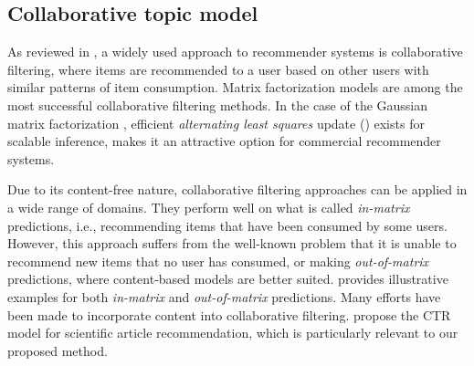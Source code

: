 
\subsection{Collaborative topic model}\label{chpt:content:sec:ctm}

As reviewed in , a widely used approach to recommender systems is collaborative filtering, where items are recommended to a user based on other
users with similar patterns of item consumption. Matrix factorization models \citep{hu2008collaborative, koren2009matrix} are among the most successful collaborative filtering methods. In the case of the Gaussian matrix factorization \citep{salakhutdinov2007probabilistic}, efficient \textit{alternating least squares} update () exists for scalable inference, makes it an attractive option for commercial recommender systems.

Due to its content-free nature, collaborative filtering approaches can be applied in a wide range of domains. They perform well on what is called \emph{in-matrix} predictions, i.e., recommending items that have been consumed by some users. However, this approach suffers from the well-known problem that it is unable to recommend new items that no user has consumed, or making \emph{out-of-matrix} predictions, where content-based models are better suited.  provides illustrative examples for both \emph{in-matrix} and \emph{out-of-matrix} predictions. Many efforts have been made to incorporate content into collaborative filtering. \citet{wang2011collaborative} propose the \gls{CTR} model for scientific article recommendation, which is particularly relevant to our proposed method.  

